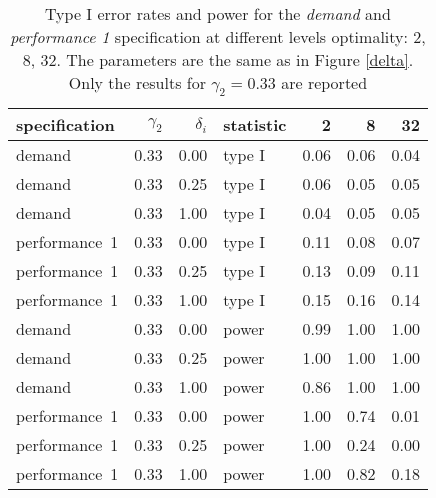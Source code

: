 \begin{table}[ht]
\centering
\begingroup\footnotesize
\begin{tabular}{lrrlrrr}
  \hline
specification & $\gamma_2$ & $\delta_i$ & statistic & 2 & 8 & 32 \\ 
  \hline
demand & 0.33 & 0.00 & type I & 0.06 & 0.06 & 0.04 \\ 
  demand & 0.33 & 0.25 & type I & 0.06 & 0.05 & 0.05 \\ 
  demand & 0.33 & 1.00 & type I & 0.04 & 0.05 & 0.05 \\ 
  performance~1 & 0.33 & 0.00 & type I & 0.11 & 0.08 & 0.07 \\ 
  performance~1 & 0.33 & 0.25 & type I & 0.13 & 0.09 & 0.11 \\ 
  performance~1 & 0.33 & 1.00 & type I & 0.15 & 0.16 & 0.14 \\ 
  demand & 0.33 & 0.00 & power & 0.99 & 1.00 & 1.00 \\ 
  demand & 0.33 & 0.25 & power & 1.00 & 1.00 & 1.00 \\ 
  demand & 0.33 & 1.00 & power & 0.86 & 1.00 & 1.00 \\ 
  performance~1 & 0.33 & 0.00 & power & 1.00 & 0.74 & 0.01 \\ 
  performance~1 & 0.33 & 0.25 & power & 1.00 & 0.24 & 0.00 \\ 
  performance~1 & 0.33 & 1.00 & power & 1.00 & 0.82 & 0.18 \\ 
   \hline
\end{tabular}
\endgroup
\caption{Type I error rates and power for the \emph{demand} and
             \emph{performance 1} specification at different levels optimality: 
             2, 8, 32. The parameters are the same as in Figure \ref{delta}.
             Only the results for $\gamma_{2} = 0.33$ are reported} 
\label{delta-table}
\end{table}
